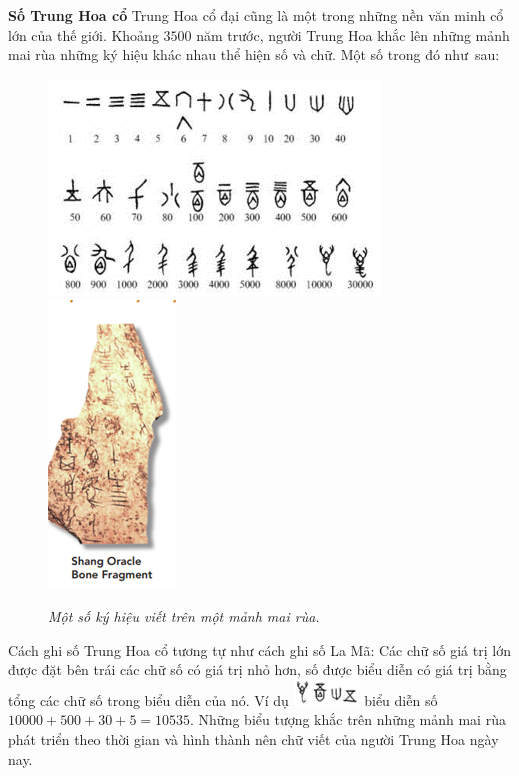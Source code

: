 \begin{multicols}{2}
\begin{figure}[H]
		\vspace*{-12pt}
	\end{figure}
	\vskip 0.1cm
	\textbf{\color{toancuabi}Số Trung Hoa cổ}
	\vskip 0.1cm
	Trung Hoa cổ đại cũng là một trong những nền văn minh cổ lớn của thế giới. Khoảng $3500$ năm trước, người Trung Hoa khắc lên những mảnh mai rùa những ký hiệu khác nhau thể hiện số và chữ. Một số trong đó như~sau:
	\begin{figure}[H]
		\centering
		\captionsetup{labelformat= empty, justification=centering}
		\includegraphics[height=0.45\linewidth]{40}\quad
		\includegraphics[height=0.45\linewidth]{41}
		\caption{\textit{\color{toancuabi}Một số ký hiệu viết trên một mảnh mai rùa.}}
		\vspace*{-10pt}
	\end{figure}
	Cách ghi số Trung Hoa cổ tương tự như cách ghi số La Mã: Các chữ số giá trị lớn được đặt bên trái các chữ số có  giá trị nhỏ hơn, số được biểu diễn có giá trị bằng tổng các chữ số trong biểu diễn của nó. Ví dụ \includegraphics[scale=0.7]{42} biểu diễn số $10000 + 500 + 30 + 5 =10535$. Những biểu tượng khắc trên những mảnh mai rùa phát triển theo thời gian và hình thành nên chữ viết của người Trung Hoa ngày nay. 

\end{multicols}
